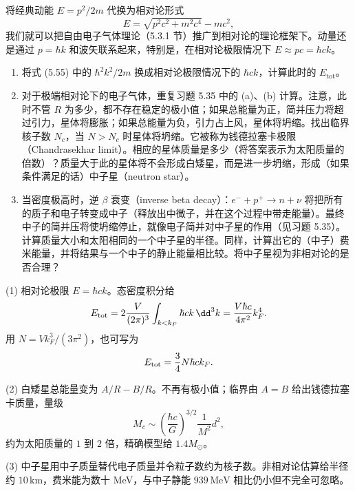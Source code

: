 \begin{question}
将经典动能 $E=p^2/2m$ 代换为相对论形式
\[
E=\sqrt{p^2c^2+m^2c^4}-mc^2,
\]
我们就可以把自由电子气体理论（5.3.1 节）推广到相对论的理论框架下。动量还是通过 $p=\hbar k$ 和波矢联系起来，特别是，在相对论极限情况下 $E\approx pc=\hbar ck$。
\begin{enumerate}
\item 将式 (5.55) 中的 $\hbar^2k^2/2m$ 换成相对论极限情况下的 $\hbar ck$，计算此时的 $E_{\mathrm{tot}}$。
\item 对于极端相对论下的电子气体，重复习题 5.35 中的 (a)、(b) 计算。注意，此时不管 $R$ 为多少，都不存在稳定的极小值；如果总能量为正，简并压力将超过引力，星体将膨胀；如果总能量为负，引力占上风，星体将坍缩。找出临界核子数 $N_c$，当 $N>N_c$ 时星体将坍缩。它被称为钱德拉塞卡极限（Chandrasekhar limit）。相应的星体质量是多少（将答案表示为太阳质量的倍数）？质量大于此的星体将不会形成白矮星，而是进一步坍缩，形成（如果条件满足的话）中子星（neutron star）。
\item 当密度极高时，逆 $\beta$ 衰变（inverse beta decay）：$e^-+p^+\to n+\nu$ 将把所有的质子和电子转变成中子（释放出中微子，并在这个过程中带走能量）。最终中子的简并压将使坍缩停止，就像电子简并对中子星的作用（见习题 5.35）。计算质量大小和太阳相同的一个中子星的半径。同样，计算出它的（中子）费米能量，并将结果与一个中子的静止能量相比较。将中子星视为非相对论的是否合理？
\end{enumerate}

\par\smallskip
{}

\end{question}
\begin{solution}

(1) 相对论极限 $E=\hbar ck$。态密度积分给
\[
E_{\rm tot}=2\frac{V}{(2\pi)^3}\int_{k<k_F}\hbar ck\,\dd^3k
=\frac{V\hbar c}{4\pi^2}k_F^4.
\]
用 $N=Vk_F^3/(3\pi^2)$，也可写为
\[
E_{\rm tot}=\frac34N\hbar ck_F.
\]

(2) 白矮星总能量变为 $A/R-B/R$。不再有极小值；临界由 $A=B$ 给出钱德拉塞卡质量，量级
\[
M_c\sim \left(\frac{\hbar c}{G}\right)^{3/2}\frac{1}{M^2}d^2,
\]
约为太阳质量的 $1$ 到 $2$ 倍，精确模型给 $1.4M_\odot$。

(3) 中子星用中子质量替代电子质量并令粒子数约为核子数。非相对论估算给半径约 $10\,\mathrm{km}$，费米能为数十 MeV，与中子静能 $939\,\mathrm{MeV}$ 相比仍小但不完全可忽略。

\end{solution}

